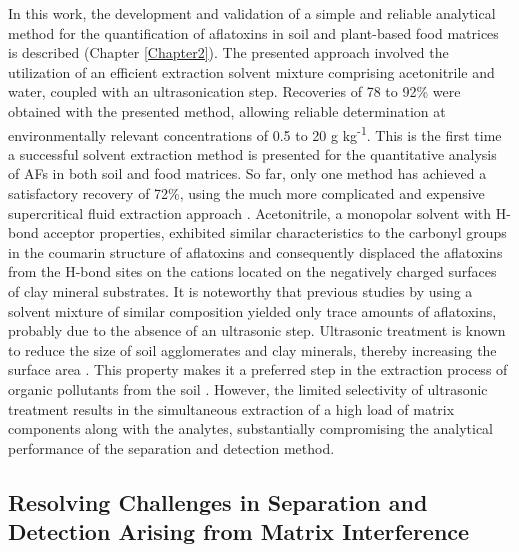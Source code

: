 In this work, the development and validation of a simple and reliable analytical method for the quantification of aflatoxins in soil and plant-based food matrices is described (Chapter \ref{Chapter2}). The presented approach involved the utilization of an efficient extraction solvent mixture comprising acetonitrile and water, coupled with an ultrasonication step. Recoveries of 78 to 92\% were obtained with the presented method, allowing reliable determination at environmentally relevant concentrations of 0.5 to 20 \textmu{}g kg\textsuperscript{-1}. This is the first time a successful solvent extraction method is presented for the quantitative analysis of AFs in both soil and food matrices. So far, only one method has achieved a satisfactory recovery of 72\%, using the much more complicated and expensive supercritical fluid extraction approach \citep{starr2008supercritical}. Acetonitrile, a monopolar solvent with H-bond acceptor properties, exhibited similar characteristics to the carbonyl groups in the coumarin structure of aflatoxins and consequently displaced the aflatoxins from the H-bond sites on the cations located on the negatively charged surfaces of clay mineral substrates. It is noteworthy that previous studies by \citet{madden1993preliminary} using a solvent mixture of similar composition yielded only trace amounts of aflatoxins, probably due to the absence of an ultrasonic step. Ultrasonic treatment is known to reduce the size of soil agglomerates and clay minerals, thereby increasing the surface area \citep{lesueur2008comparison}. This property makes it a preferred step in the extraction process of organic pollutants from the soil \citep{bossio2008application}. However, the limited selectivity of ultrasonic treatment results in the simultaneous extraction of a high load of matrix components along with the analytes, substantially compromising the analytical performance of the separation and detection method. 

\subsection{Resolving Challenges in Separation and Detection Arising from Matrix Interference} 

